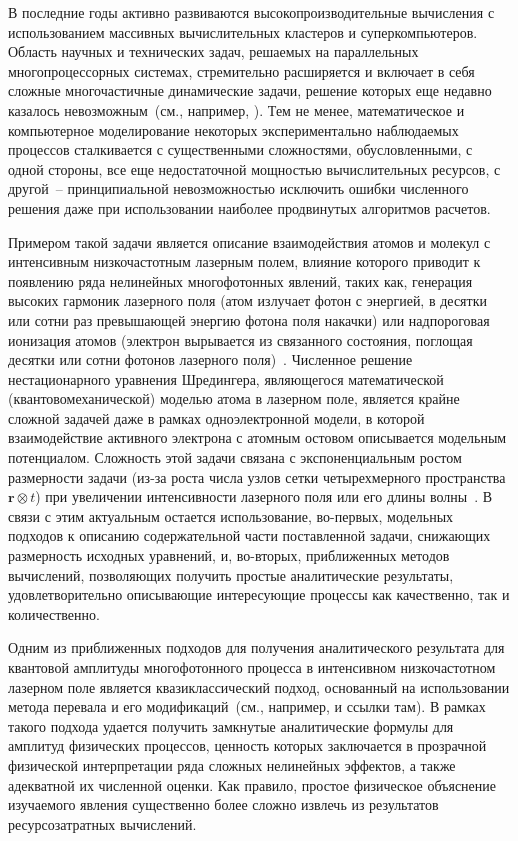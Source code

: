 \documentclass[14pt, a4paper]{article}
\numberwithin{figure}{section}
\numberwithin{equation}{section}
\newcommand{\vr}{\mathbf{r}}
\begin{document}
В последние годы активно развиваются высокопроизводительные вычисления с использованием массивных вычислительных кластеров и суперкомпьютеров. Область научных и технических задач, решаемых на параллельных многопроцессорных системах, стремительно расширяется и включает в себя сложные многочастичные динамические задачи, решение которых еще недавно казалось невозможным~(см., например, \cite{almanah}). Тем не менее, математическое и компьютерное моделирование некоторых экспериментально наблюдаемых процессов сталкивается с существенными сложностями, обусловленными, с одной стороны, все еще недостаточной мощностью вычислительных ресурсов, с другой~-- принципиальной невозможностью исключить ошибки численного решения даже при использовании наиболее продвинутых алгоритмов расчетов.  

Примером такой задачи является описание взаимодействия атомов и молекул с интенсивным низкочастотным лазерным полем, влияние которого приводит к появлению ряда нелинейных многофотонных явлений, таких как, генерация высоких гармоник лазерного поля (атом излучает фотон с энергией, в десятки или сотни раз превышающей энергию фотона поля накачки) или надпороговая ионизация атомов (электрон вырывается из связанного состояния, поглощая десятки или сотни фотонов лазерного поля)~\cite{SalScience01,ADVBecker2002,MEAdv03}. Численное решение нестационарного уравнения Шредингера, являющегося математической (квантовомеханической) моделью атома в лазерном поле, является крайне сложной задачей даже в рамках одноэлектронной модели, в которой взаимодействие активного электрона с атомным остовом описывается модельным потенциалом. Сложность этой задачи связана с экспоненциальным ростом размерности задачи (из-за роста числа узлов сетки четырехмерного пространства $\vr\otimes t$) при увеличении интенсивности лазерного поля или его длины волны~\cite{parall}. В связи с этим актуальным остается использование, во-первых, модельных подходов к описанию содержательной части поставленной задачи, снижающих размерность исходных уравнений, и, во-вторых, приближенных методов вычислений, позволяющих получить простые аналитические результаты, удовлетворительно описывающие интересующие процессы как качественно, так и количественно.

Одним из приближенных подходов для получения аналитического результата для квантовой амплитуды многофотонного процесса в интенсивном низкочастотном лазерном поле является квазиклассический подход, основанный на использовании метода перевала и его модификаций~(см., например, \cite{FFMSZPRA13,main} и ссылки там). В рамках такого подхода удается получить замкнутые аналитические формулы для амплитуд физических процессов, ценность которых заключается в прозрачной физической интерпретации ряда сложных нелинейных эффектов, а также адекватной их численной оценки. Как правило, простое физическое объяснение изучаемого явления существенно более сложно извлечь из результатов ресурсозатратных вычислений.
\end{document}
